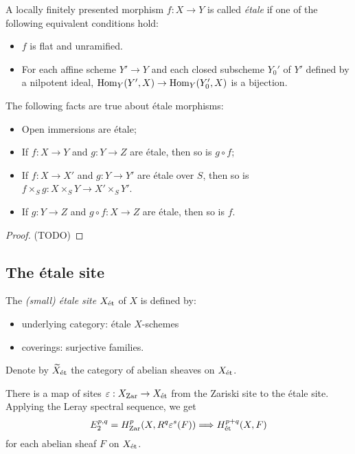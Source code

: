 \documentclass[11pt]{amsart}
\begin{document}
\begin{defn}
    A locally finitely presented morphism $f:X\to Y$ is called \emph{\'etale} if one of the following equivalent conditions hold:
    \begin{itemize}
        \item $f$ is flat and unramified.
        \item For each affine scheme $Y'\to Y$ and each closed subscheme $Y_0'$ of $Y'$ defined by a nilpotent ideal, $\operatorname{Hom}_Y(Y',X) \to \operatorname{Hom}_Y(Y_0',X)$ is a bijection.
    \end{itemize}
\end{defn}

\begin{prop}
    The following facts are true about \'etale morphisms:
    \begin{itemize}
        \item Open immersions are \'etale;
        \item If $f:X\to Y$ and $g:Y\to Z$ are \'etale, then so is $g\circ f$;
        \item If $f:X\to X'$ and $g:Y\to Y'$ are \'etale over $S$, then so is $f\times_S g: X\times_S Y\to X'\times_S Y'$.
        \item If $g:Y\to Z$ and $g\circ f: X\to Z$ are \'etale, then so is $f$.
    \end{itemize}
\end{prop}

\begin{proof}
    (TODO)
\end{proof}

\subsection{The \'etale site}


\begin{defn}
    The \emph{(small) \'etale site} $X_{\operatorname{\acute{e}t}}$ of $X$ is defined by:
    \begin{itemize}
        \item underlying category: \'etale $X$-schemes
        \item coverings: surjective families.
    \end{itemize}
    Denote by $\widetilde{X}_{\operatorname{\acute{e}t}}$ the category of abelian sheaves on $X_{\operatorname{\acute{e}t}}$.
\end{defn}

There is a map of sites $\varepsilon: X_{\operatorname{Zar}} \to X_{\operatorname{\acute{e}t}}$ from the Zariski site to the \'etale site. Applying the Leray spectral sequence, we get
\[E_2^{p,q} = H^p_{\operatorname{Zar}}(X, R^q\varepsilon^s(F))\Longrightarrow H^{p+q}_{\operatorname{\acute{e}t}}(X, F)\]
for each abelian sheaf $F$ on $X_{\operatorname{\acute{e}t}}$.
\end{document}
